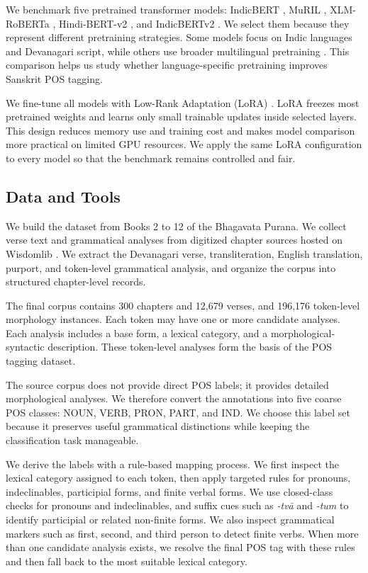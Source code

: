\documentclass[conference]{IEEEtran}
\begin{document}
We benchmark five pretrained transformer models: IndicBERT \cite{kakwani2020}, MuRIL \cite{khanuja2021muril}, XLM-RoBERTa \cite{conneau2020xlmr}, Hindi-BERT-v2 \cite{joshi2022hindbert}, and IndicBERTv2 \cite{doddapaneni2023}. We select them because they represent different pretraining strategies. Some models focus on Indic languages and Devanagari script, while others use broader multilingual pretraining \cite{devlin2019bert,lan2020albert,liu2019roberta}. This comparison helps us study whether language-specific pretraining improves Sanskrit POS tagging.

We fine-tune all models with Low-Rank Adaptation (LoRA) \cite{hu2022lora}. LoRA freezes most pretrained weights and learns only small trainable updates inside selected layers. This design reduces memory use and training cost and makes model comparison more practical on limited GPU resources. We apply the same LoRA configuration to every model so that the benchmark remains controlled and fair.

\subsection{Data and Tools}
We build the dataset from Books 2 to 12 of the Bhagavata Purana. We collect verse text and grammatical analyses from digitized chapter sources hosted on Wisdomlib \cite{wisdomlib}. We extract the Devanagari verse, transliteration, English translation, purport, and token-level grammatical analysis, and organize the corpus into structured chapter-level records.

The final corpus contains 300 chapters and 12,679 verses, and 196,176 token-level morphology instances. Each token may have one or more candidate analyses. Each analysis includes a base form, a lexical category, and a morphological-syntactic description. These token-level analyses form the basis of the POS tagging dataset.

The source corpus does not provide direct POS labels; it provides detailed morphological analyses. We therefore convert the annotations into five coarse POS classes: NOUN, VERB, PRON, PART, and IND. We choose this label set because it preserves useful grammatical distinctions while keeping the classification task manageable.

We derive the labels with a rule-based mapping process. We first inspect the lexical category assigned to each token, then apply targeted rules for pronouns, indeclinables, participial forms, and finite verbal forms. We use closed-class checks for pronouns and indeclinables, and suffix cues such as \emph{-tv\={a}} and \emph{-tum} to identify participial or related non-finite forms. We also inspect grammatical markers such as first, second, and third person to detect finite verbs. When more than one candidate analysis exists, we resolve the final POS tag with these rules and then fall back to the most suitable lexical category.
\end{document}
